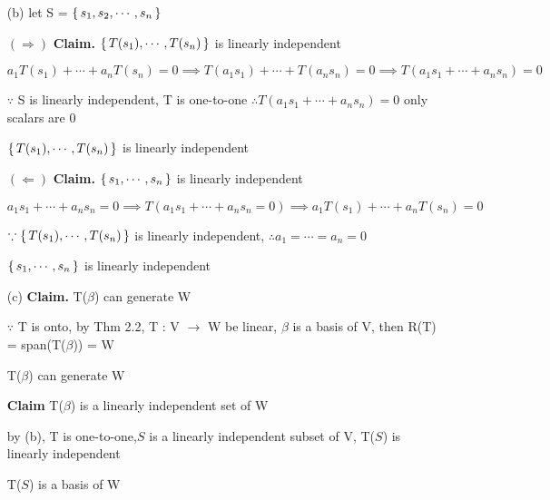 \begin{tcolorbox}
	\begin{enumerate}
		\item[(b)] let S = $\left\{ \,s_1,s_2,\cdots,s_n \,\right\}$
		
		$(\Rightarrow)$ \textbf{Claim.} $\left\{ \,T(s_1),\cdots,T(s_n) \,\right\}$ is linearly independent
		
		$a_1T(s_1)+\cdots+a_nT(s_n)=0 \implies T(a_1s_1)+\cdots+T(a_ns_n) = 0 \implies T(a_1s_1+\cdots+a_ns_n) = 0$
		
		$\because$ S is linearly independent, T is one-to-one $\therefore T(a_1s_1 + \cdots + a_ns_n) =0$ only scalars are $0$
		
		$\left\{ \,T(s_1),\cdots,T(s_n) \,\right\}$ is linearly independent
		
		$(\Leftarrow)$ \textbf{Claim.} $\left\{ \,s_1,\cdots,s_n \,\right\}$ is linearly independent
		
		$a_1s_1+\cdots+a_ns_n = 0 \implies T(a_1s_1+\cdots+a_ns_n=0)\implies a_1T(s_1) + \cdots + a_nT(s_n) = 0$
		
		$\because \left\{ \,T(s_1),\cdots,T(s_n) \,\right\}$ is linearly independent, $\therefore a_1=\cdots=a_n=0$
		
		$\left\{ \,s_1,\cdots,s_n \,\right\}$ is linearly independent
		
		\item[(c)] \textbf{Claim.} T($\beta$) can generate W
		
		$\because$ T is onto, by Thm 2.2, T : V $\rightarrow$ W be linear, $\beta$ is a basis of V, then R(T) = span(T($\beta$)) = W
		
		T($\beta$) can generate W
		
		\textbf{Claim} T($\beta$) is a linearly independent set of W
		
		by (b), T is one-to-one,$S$ is a linearly independent subset of V, T($S$) is linearly independent
		
		T($S$) is a basis of W
	\end{enumerate}
\end{tcolorbox}